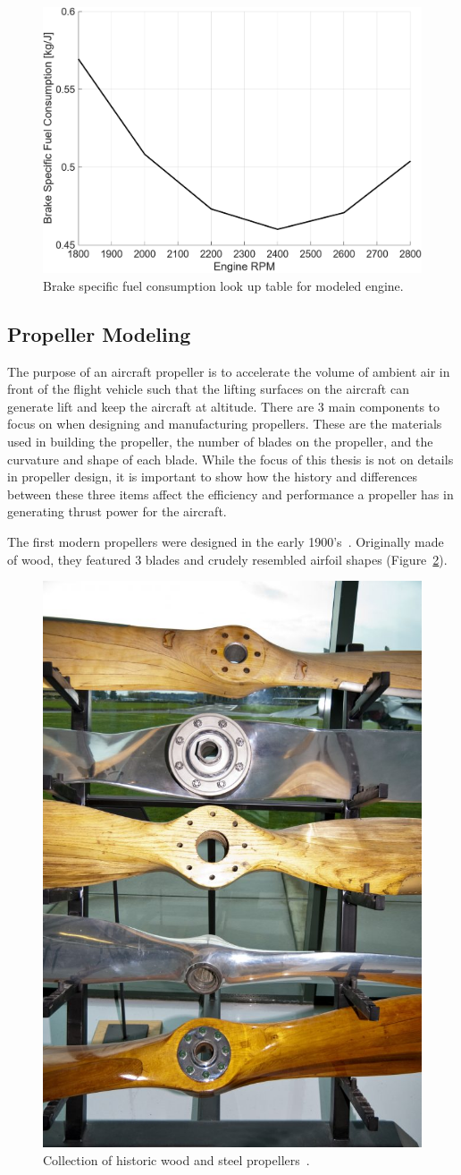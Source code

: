 \begin{figure}[!ht]
    \centering
    \includegraphics[width=.75\linewidth]{Figures/BSFCLUT.png}
    \caption{Brake specific fuel consumption look up table for modeled engine.}\label{fig:BSFCLUT}
\end{figure}

\subsection{\textbf{Propeller Modeling}}
The purpose of an aircraft propeller is to accelerate the volume of ambient air in front of the flight vehicle such that the lifting surfaces on the aircraft can generate lift and keep the aircraft at altitude. There are 3 main components to focus on when designing and manufacturing propellers. These are the materials used in building the propeller, the number of blades on the propeller, and the curvature and shape of each blade. While the focus of this thesis is not on details in propeller design, it is important to show how the history and differences between these three items affect the efficiency and performance a propeller has in generating thrust power for the aircraft.

The first modern propellers were designed in the early 1900's~\cite{ianHowIdentifyHistoric2016}. Originally made of wood, they featured 3 blades and crudely resembled airfoil shapes (Figure~\ref{fig:woodprops}).

\begin{figure}[!ht]
    \centering
    \includegraphics[width=0.3\linewidth]{Figures/woodProps.jpg}
    \caption{Collection of historic wood and steel propellers~\cite{ianHowIdentifyHistoric2016}.}\label{fig:woodprops}
\end{figure}

